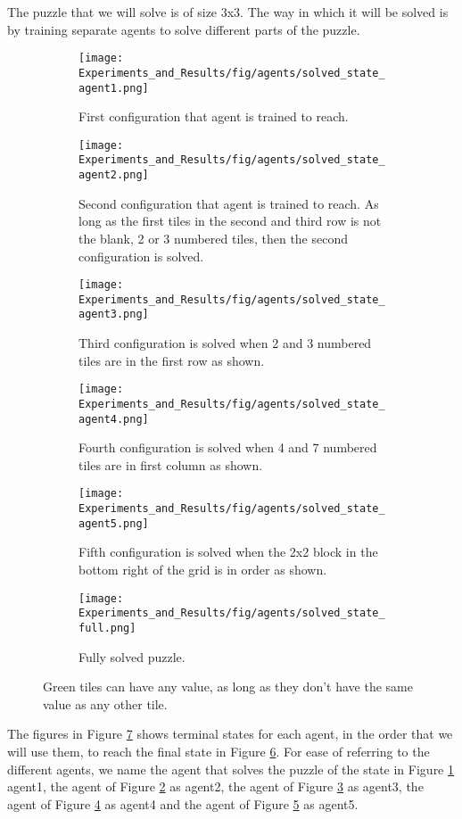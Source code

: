The puzzle that we will solve is of size 3x3. The way in which it will be solved is by training separate agents to solve different parts of the puzzle.
\begin{figure}[h!]
	\begin{subfigure}[t]{.30\textwidth}
		\centering
		\texttt{[image: Experiments\_and\_Results/fig/agents/solved\_state\_agent1.png]}
		\caption{First configuration that agent is trained to reach.}
		\label{fig:solved_state_agent1}
	\end{subfigure}
	\begin{subfigure}[t]{.33\textwidth}
		\centering
		\texttt{[image: Experiments\_and\_Results/fig/agents/solved\_state\_agent2.png]}
		\caption{Second configuration that agent is trained to reach. As long as the first tiles in the second and third row is not the blank, 2 or 3 numbered tiles, then the second configuration is solved.}
		\label{fig:solved_state_agent2}
	\end{subfigure}
	\begin{subfigure}[t]{.33\textwidth}
		\centering
		\texttt{[image: Experiments\_and\_Results/fig/agents/solved\_state\_agent3.png]}
		\caption{Third configuration is solved when 2 and 3 numbered tiles are in the first row as shown.}
		\label{fig:solved_state_agent3}
	\end{subfigure}
	\begin{subfigure}[t]{.3\textwidth}
		\centering
		\texttt{[image: Experiments\_and\_Results/fig/agents/solved\_state\_agent4.png]}
		\caption{Fourth configuration is solved when 4 and 7 numbered tiles are in first column as shown.}
		\label{fig:solved_state_agent4}
	\end{subfigure}
	\begin{subfigure}[t]{.33\textwidth}
		\centering
		\texttt{[image: Experiments\_and\_Results/fig/agents/solved\_state\_agent5.png]}
		\caption{Fifth configuration is solved when the 2x2 block in the bottom right of the grid is in order as shown.}
		\label{fig:solved_state_agent5}
	\end{subfigure}
	\begin{subfigure}[t]{.33\textwidth}
		\centering
		\texttt{[image: Experiments\_and\_Results/fig/agents/solved\_state\_full.png]}
		\caption{Fully solved puzzle.}
		\label{fig:solved_state_agent_full}
	\end{subfigure}
	\caption{Green tiles can have any value, as long as they don't have the same value as any other tile.}
	\label{fig:solved_states}
\end{figure}
The figures in Figure \ref{fig:solved_states} shows terminal states for each agent, in the order that we will use them, to reach the final state in Figure \ref{fig:solved_state_agent_full}. For ease of referring to the different agents, we name the agent that solves the puzzle of the state in Figure \ref{fig:solved_state_agent1} agent1, the agent of Figure \ref{fig:solved_state_agent2} as agent2, the agent of Figure \ref{fig:solved_state_agent3} as agent3, the agent of Figure \ref{fig:solved_state_agent4} as agent4 and the agent of Figure \ref{fig:solved_state_agent5} as agent5.\\

